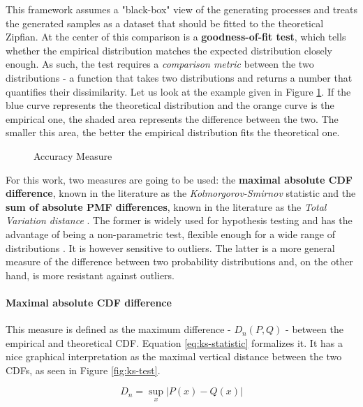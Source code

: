 This framework assumes a "black-box" view of the generating processes and treats the generated samples as a dataset that should be fitted to the theoretical Zipfian. 
At the center of this comparison is a \textbf{goodness-of-fit test}, which tells whether the empirical distribution matches the expected distribution closely enough.
As such, the test requires a \textit{comparison metric} between the two distributions - a function that takes two distributions and returns a number that quantifies their dissimilarity. 
Let us look at the example given in Figure \ref{fig:accuracy-measure}. If the blue curve represents the theoretical distribution and the orange curve is the empirical one,
the shaded area represents the difference between the two. The smaller this area, the better the empirical distribution fits the theoretical one.

\begin{figure}[h]
    \centering
    
    \caption{Accuracy Measure}\label{fig:accuracy-measure}
\end{figure}

For this work, two measures are going to be used: the \textbf{maximal absolute CDF difference}, known in the literature as the \textit{Kolmorgorov-Smirnov} statistic and the 
\textbf{sum of absolute PMF differences}, known in the literature as the \textit{Total Variation distance} \cite{marsagliaEvaluatingKolmogorovsDistribution2003,leydoldErrorDetectionNonUniforma}.
The former is widely used for hypothesis testing and has the advantage of being a non-parametric test, flexible enough for a wide range of distributions \cite{KolmogorovSmirnovTest2008}. It is however
sensitive to outliers. The latter is a more general measure of the difference between two probability distributions and, on the other hand, is more resistant against outliers.

\paragraph{Maximal absolute CDF difference}
This measure is defined as the maximum difference - $D_{n}(P,Q)$ - between the empirical and theoretical
\ac{CDF}. Equation \ref{eq:ks-statistic} formalizes it. It has a nice graphical interpretation as the maximal vertical 
distance between the two \ac{CDF}s, as seen in Figure \ref{fig:ks-test}.

\begin{equation}
D_n = \sup_x |P(x) - Q(x)|
\label{eq:ks-statistic}
\end{equation}

